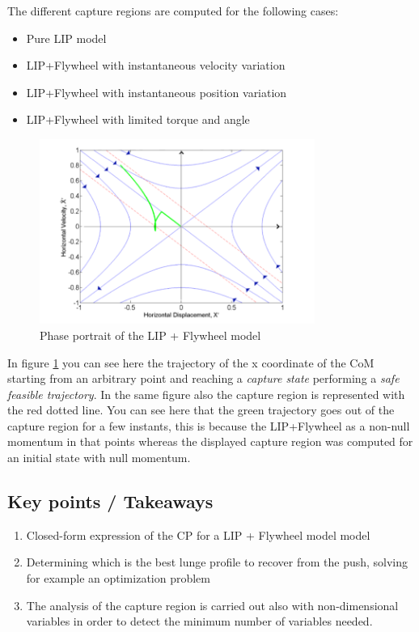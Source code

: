 The different capture regions are computed for the following cases:
\begin{itemize}
\item Pure LIP model
\item LIP+Flywheel with instantaneous velocity variation
\item LIP+Flywheel with instantaneous position variation
\item LIP+Flywheel with limited torque and angle
\end{itemize}
\begin{figure}
  \centering
  \includegraphics[width=90mm]{CPPhasePlane}
  \caption{Phase portrait of the LIP + Flywheel model}
  \label{PhasePlane}
\end{figure}
In figure \ref{PhasePlane} you can see here the trajectory of the x coordinate of the CoM starting from an arbitrary point and reaching a \textit{capture state} performing a \textit{safe feasible trajectory}. In the same figure also the capture region is represented with the red dotted line. You can see here that the green trajectory goes out of the capture region for a few instants, this is because the LIP+Flywheel as a non-null momentum in that points whereas the displayed capture region was computed for an initial state with null momentum.
\subsection*{Key points / Takeaways}
\begin{enumerate}
\item Closed-form expression of the CP for a LIP +  Flywheel model model 
\item Determining which is the best lunge profile to recover from the push, solving for example an optimization problem
\item The analysis of the capture region is carried out also with non-dimensional variables in order to detect the minimum number of variables needed.
\end{enumerate}
